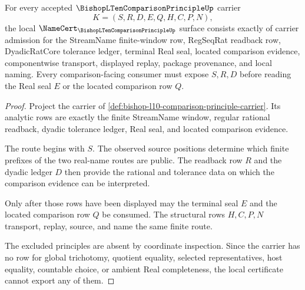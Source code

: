 \begin{theorem}
\label{thm:bishop-l10-comparison-principle-namecert-obligations}
For every accepted $\BishopLTenComparisonPrincipleUp$ carrier
$$
K=(S,R,D,E,Q,H,C,P,N),
$$
the local $\NameCert_{\BishopLTenComparisonPrincipleUp}$ surface consists exactly of carrier admission for the StreamName finite-window row, RegSeqRat readback row, DyadicRatCore tolerance ledger, terminal Real seal, located comparison evidence, componentwise transport, displayed replay, package provenance, and local naming. Every comparison-facing consumer must expose $S,R,D$ before reading the Real seal $E$ or the located comparison row $Q$.
\end{theorem}
\begin{proof}
Project the carrier of \autoref{def:bishop-l10-comparison-principle-carrier}. Its analytic rows are exactly the finite StreamName window, regular rational readback, dyadic tolerance ledger, Real seal, and located comparison evidence.

The route begins with $S$. The observed source positions determine which finite prefixes of the two real-name routes are public. The readback row $R$ and the dyadic ledger $D$ then provide the rational and tolerance data on which the comparison evidence can be interpreted.

Only after those rows have been displayed may the terminal seal $E$ and the located comparison row $Q$ be consumed. The structural rows $H,C,P,N$ transport, replay, source, and name the same finite route.

The excluded principles are absent by coordinate inspection. Since the carrier has no row for global trichotomy, quotient equality, selected representatives, host equality, countable choice, or ambient Real completeness, the local certificate cannot export any of them.
\end{proof}

